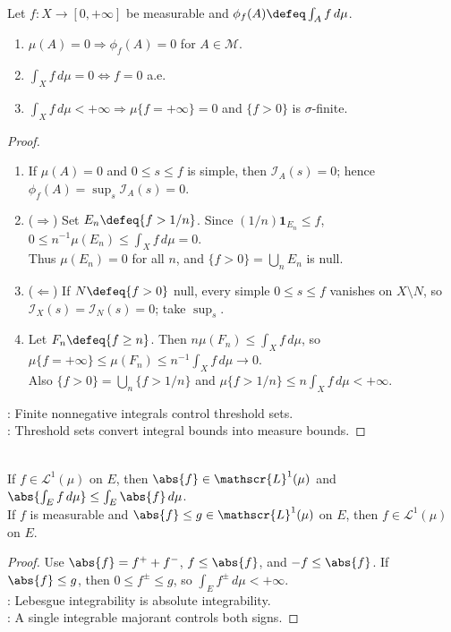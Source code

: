 \begin{corollary} \label{cor:integral-null-and-finite-ae-consequences} \\
Let $f:X\to[0,+\infty]$ be measurable and $\phi_f(A)\defeq\int_A f\,d\mu$.
\begin{enumerate}[label=(\roman*)]
\setlength{\itemsep}{0pt}
\item $\mu(A)=0\Longrightarrow\phi_f(A)=0$ for $A\in\mathcal{M}$.
\item $\int_X f\,d\mu=0\Longleftrightarrow f=0$ a.e.
\item $\int_X f\,d\mu<+\infty\Longrightarrow\mu\{f=+\infty\}=0$ and $\{f>0\}$ is $\sigma$-finite.
\end{enumerate}
\begin{proof}
\begin{enumerate}[label=(\roman*)]
\setlength{\itemsep}{0pt}
\item[$(i)$] If $\mu(A)=0$ and $0\leq s\leq f$ is simple, then $\mathcal{I}_A(s)=0$; hence $\phi_f(A)=\sup_s\mathcal{I}_A(s)=0$.
\item[$(ii)$] ($\Rightarrow$) Set $E_n\defeq\{f>1/n\}$. Since $(1/n)\mathbf{1}_{E_n}\leq f$, $0\leq n^{-1}\mu(E_n)\leq\int_X f\,d\mu=0$.\\
Thus $\mu(E_n)=0$ for all $n$, and $\{f>0\}=\bigcup_nE_n$ is null.
\item[$(ii)$] ($\Leftarrow$) If $N\defeq\{f>0\}$ null, every simple $0\leq s\leq f$ vanishes on $X\setminus N$, so $\mathcal{I}_X(s)=\mathcal{I}_N(s)=0$; take $\sup_s$.
\item[$(iii)$] Let $F_n\defeq\{f\geq n\}$. Then $n\mu(F_n)\leq\int_X f\,d\mu$, so $\mu\{f=+\infty\}\leq\mu(F_n)\leq n^{-1}\int_X f\,d\mu\to0$.\\
Also $\{f>0\}=\bigcup_n\{f>1/n\}$ and $\mu\{f>1/n\}\leq n\int_X f\,d\mu<+\infty$.
\end{enumerate}
: Finite nonnegative integrals control threshold sets.\\
: Threshold sets convert integral bounds into measure bounds.
\end{proof}
\end{corollary}

\begin{theorem} \label{thm:absolute-integrability-and-domination} \\
If $f\in\mathscr{L}^1(\mu)$ on $E$, then $\abs{f}\in\mathscr{L}^1(\mu)$ and $\abs{\int_E f\,d\mu}\leq\int_E\abs{f}\,d\mu$.\\
If $f$ is measurable and $\abs{f}\leq g\in\mathscr{L}^1(\mu)$ on $E$, then $f\in\mathscr{L}^1(\mu)$ on $E$.
\begin{proof}
Use $\abs{f}=f^++f^-$, $f\leq\abs{f}$, and $-f\leq\abs{f}$. If $\abs{f}\leq g$, then $0\leq f^\pm\leq g$, so $\int_Ef^\pm\,d\mu<+\infty$.\\
: Lebesgue integrability is absolute integrability.\\
: A single integrable majorant controls both signs.
\end{proof}
\end{theorem}


